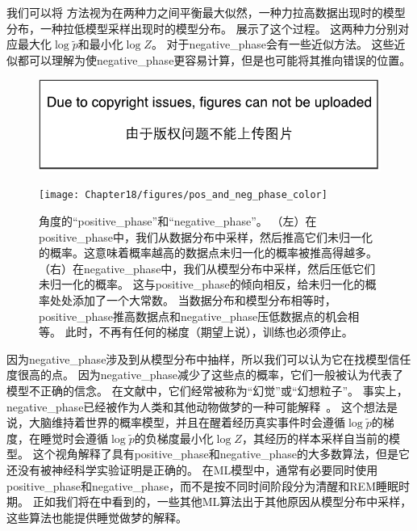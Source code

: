 我们可以将\,\,方法视为在两种力之间平衡最大似然，一种力拉高数据出现时的模型分布，一种拉低模型采样出现时的模型分布。%
展示了这个过程。
这两种力分别对应最大化$\log \tilde{p}$和最小化$\log Z$。
对于\gls{negative_phase}会有一些近似方法。
这些近似都可以理解为使\gls{negative_phase}更容易计算，但是也可能将其推向错误的位置。%

\begin{figure}[!htb]
\ifOpenSource
\centerline{\includegraphics{figure.pdf}}
\else
\centerline{\texttt{[image: Chapter18/figures/pos\_and\_neg\_phase\_color]}}
\fi
\caption{角度的``\gls{positive_phase}''和``\gls{negative_phase}''。
（左）在\gls{positive_phase}中，我们从数据分布中采样，然后推高它们未归一化的概率。这意味着概率越高的数据点未归一化的概率被推高得越多。
（右）在\gls{negative_phase}中，我们从模型分布中采样，然后压低它们未归一化的概率。
这与\gls{positive_phase}的倾向相反，给未归一化的概率处处添加了一个大常数。
当数据分布和模型分布相等时，\gls{positive_phase}推高数据点和\gls{negative_phase}压低数据点的机会相等。
此时，不再有任何的梯度（期望上说），训练也必须停止。}
\label{fig:chap18_pos_and_neg_phase}
\end{figure}


因为\gls{negative_phase}涉及到从模型分布中抽样，所以我们可以认为它在找模型信任度很高的点。
因为\gls{negative_phase}减少了这些点的概率，它们一般被认为代表了模型不正确的信念。
在文献中，它们经常被称为``幻觉''或``幻想粒子''。
事实上，\gls{negative_phase}已经被作为人类和其他动物做梦的一种可能解释~\citep{CrickMitchison83}。
这个想法是说，大脑维持着世界的概率模型，并且在醒着经历真实事件时会遵循$\log \tilde{p}$的梯度，在睡觉时会遵循$\log \tilde{p}$的负梯度最小化$\log Z$，其经历的样本采样自当前的模型。
这个视角解释了具有\gls{positive_phase}和\gls{negative_phase}的大多数算法，但是它还没有被神经科学实验证明是正确的。
在\gls{ML}模型中，通常有必要同时使用\gls{positive_phase}和\gls{negative_phase}，而不是按不同时间阶段分为清醒和REM睡眠时期。
正如我们将在中看到的，一些其他\gls{ML}算法出于其他原因从模型分布中采样，这些算法也能提供睡觉做梦的解释。

